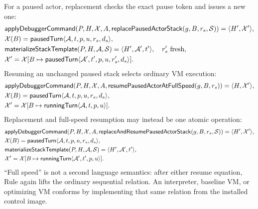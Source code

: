 For a paused actor, replacement checks the exact pause token and issues a new
one:
\begin{equation}\label{eq:replace-paused-actor-stack}
\begin{aligned}
 &\mathsf{applyDebuggerCommand}
  (P,H,\mathcal X,A,\mathsf{replacePausedActorStack}(g,B,r_s,\mathcal S))
      =\langle H',\mathcal X'\rangle,\\
 &\mathcal X(B)=\mathsf{pausedTurn}\langle
      \mathcal A,t,p,u,r_s,d_s\rangle,\\
 &\mathsf{materializeStackTemplate}(P,H,\mathcal A,\mathcal S)
      =\langle H',\mathcal A',t'\rangle,\quad r_s'\text{ fresh},\\
 &\mathcal X'=\mathcal X[B\mapsto\mathsf{pausedTurn}\langle
      \mathcal A',t',p,u,r_s',d_s\rangle].
\end{aligned}
\end{equation}
Resuming an unchanged paused stack selects ordinary VM execution:
\begin{equation}\label{eq:resume-paused-actor-full-speed}
\begin{aligned}
 &\mathsf{applyDebuggerCommand}
  (P,H,\mathcal X,A,\mathsf{resumePausedActorAtFullSpeed}(g,B,r_s))
      =\langle H,\mathcal X'\rangle,\\
 &\mathcal X(B)=\mathsf{pausedTurn}\langle
      \mathcal A,t,p,u,r_s,d_s\rangle,\\
 &\mathcal X'=\mathcal X[B\mapsto
      \mathsf{runningTurn}\langle\mathcal A,t,p,u\rangle].
\end{aligned}
\end{equation}
Replacement and full-speed resumption may instead be one atomic operation:
\begin{equation}\label{eq:replace-resume-paused-actor-stack}
\begin{aligned}
 &\mathsf{applyDebuggerCommand}(P,H,\mathcal X,A,
   \mathsf{replaceAndResumePausedActorStack}(g,B,r_s,\mathcal S))
      =\langle H',\mathcal X'\rangle,\\
 &\mathcal X(B)=\mathsf{pausedTurn}\langle
      \mathcal A,t,p,u,r_s,d_s\rangle,\\
 &\mathsf{materializeStackTemplate}(P,H,\mathcal A,\mathcal S)
      =\langle H',\mathcal A',t'\rangle,\\
 &\mathcal X'=\mathcal X[B\mapsto
      \mathsf{runningTurn}\langle\mathcal A',t',p,u\rangle].
\end{aligned}
\end{equation}
``Full speed'' is not a second language semantics: after either resume equation,
Rule  again lifts the ordinary sequential relation.
An interpreter, baseline VM, or optimizing VM conforms by implementing that
same relation from the installed control image.

